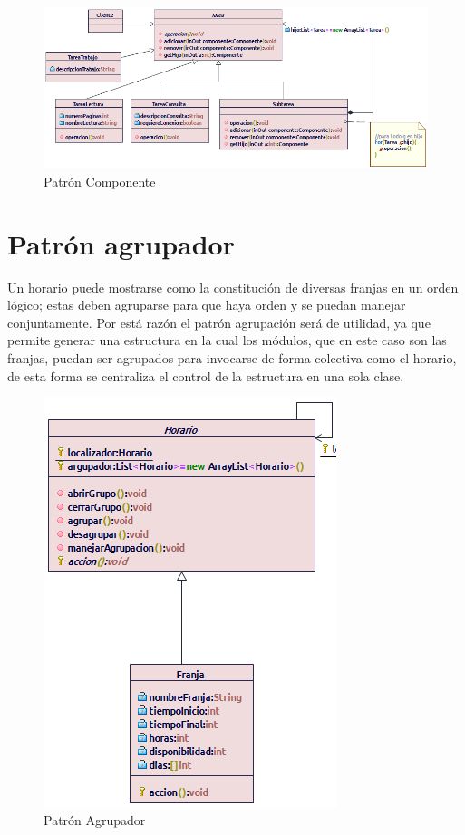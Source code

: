 \begin{figure}[H]
	\centering
	\includegraphics[width=1\linewidth]{diseno/patrones/imgs/Composite}
	\caption{Patrón Componente}
	\label{fig:gantt}
\end{figure}

\section{Patrón agrupador}
Un horario puede mostrarse como la constitución de diversas franjas en un orden lógico; estas deben agruparse para que haya orden y se puedan manejar conjuntamente. Por está razón el patrón agrupación será de utilidad, ya que permite generar una estructura en la cual los módulos, que en este caso son las franjas, puedan ser agrupados para invocarse de forma colectiva como el horario, de esta forma se centraliza el control de la estructura en una sola clase.

\begin{figure}[H]
	\centering
	\includegraphics[width=0.5\linewidth]{diseno/patrones/imgs/Agrupador}
	\caption{Patrón Agrupador}
	\label{fig:gantt}
\end{figure}

